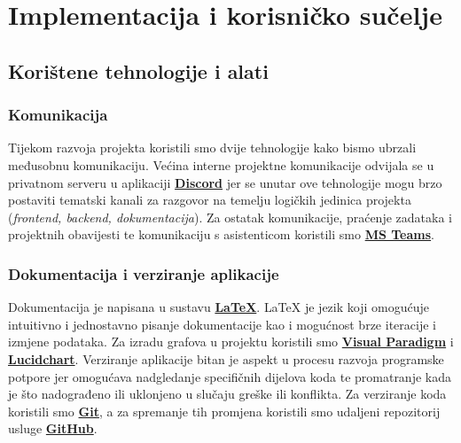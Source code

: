 \chapter{Implementacija i korisničko sučelje}
		
		
		\section{Korištene tehnologije i alati}
			
		\subsection*{Komunikacija}
			Tijekom razvoja projekta koristili smo dvije tehnologije kako bismo ubrzali međusobnu komunikaciju. Većina interne projektne komunikacije odvijala se u privatnom serveru u aplikaciji \textbf{\href{https://discord.com/}{Discord}} jer se unutar ove tehnologije mogu brzo postaviti tematski kanali za razgovor na temelju logičkih jedinica projekta (\textit{frontend, backend, dokumentacija}). Za ostatak komunikacije, praćenje zadataka i projektnih obavijesti te komunikaciju s asistenticom koristili smo \textbf{\href{https://www.microsoft.com/hr-hr/microsoft-teams/download-app}{MS Teams}}.

		\subsection*{Dokumentacija i verziranje aplikacije}
			Dokumentacija je napisana u sustavu \textbf{\href{https://www.latex-project.org/}{LaTeX}}. {LaTeX} je jezik koji omogućuje intuitivno i jednostavno pisanje dokumentacije kao i mogućnost brze iteracije i izmjene podataka. Za izradu grafova u projektu koristili smo \textbf{\href{https://www.visual-paradigm.com/}{Visual Paradigm}} i \textbf{\href{https://www.lucidchart.com/pages/}{Lucidchart}}. Verziranje aplikacije bitan je aspekt u procesu razvoja programske potpore jer omogućava nadgledanje specifičnih dijelova koda te promatranje kada je što nadograđeno ili uklonjeno u slučaju greške ili konflikta. Za verziranje koda koristili smo \textbf{\href{https://git-scm.com/}{Git}}, a za spremanje tih promjena koristili smo udaljeni repozitorij usluge \textbf{\href{https://github.com/}{GitHub}}.

